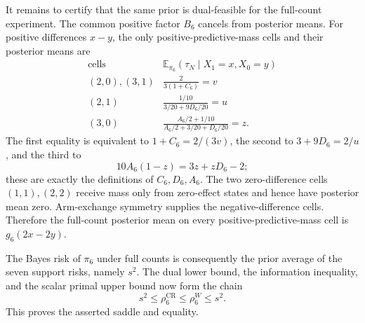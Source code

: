 It remains to certify that the same prior is dual-feasible for the full-count experiment.  The common positive factor \(B_6\) cancels from posterior means.  For positive differences \(x-y\), the only positive-predictive-mass cells and their posterior means are
\[
\begin{array}{c|c}
\text{cells}&\mathbb E_{\pi_6}(\tau_N\mid X_1=x,X_0=y)\\ \hline
(2,0),(3,1)&\displaystyle\frac{2}{3(1+C_6)}=v\\[3pt]
(2,1)&\displaystyle\frac{1/10}{3/20+9D_6/20}=u\\[3pt]
(3,0)&\displaystyle\frac{A_6/2+1/10}{A_6/2+3/20+D_6/20}=z.
\end{array}
\]
The first equality is equivalent to \(1+C_6=2/(3v)\), the second to \(3+9D_6=2/u\), and the third to
\[
 10A_6(1-z)=3z+zD_6-2;
\]
these are exactly the definitions of \(C_6,D_6,A_6\).  The two zero-difference cells \((1,1),(2,2)\) receive mass only from zero-effect states and hence have posterior mean zero.  Arm-exchange symmetry supplies the negative-difference cells.  Therefore the full-count posterior mean on every positive-predictive-mass cell is \(g_6(2x-2y)\).

The Bayes risk of \(\pi_6\) under full counts is consequently the prior average of the seven support risks, namely \(s^2\).  The dual lower bound, the information inequality, and the scalar primal upper bound now form the chain
\[
 s^2\leq\rho_6^{\mathrm{CR}}\leq\rho_6^W\leq s^2.
\]
This proves the asserted saddle and equality.

